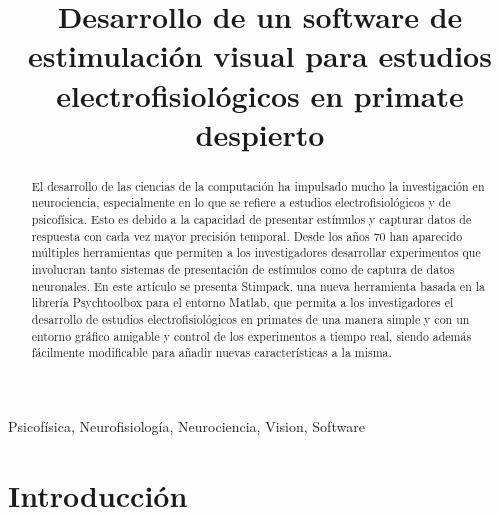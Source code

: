 \documentclass[conference]{IEEEtran}
\begin{document}
\title{Desarrollo de un software de estimulación visual para estudios electrofisiológicos en primate
despierto\\
}

\author{

}

\maketitle

\begin{abstract}
El desarrollo de las ciencias de la computación ha impulsado mucho la investigación en neurociencia, especialmente en lo que se refiere a estudios electrofisiológicos y de psicofísica. Esto es debido a la capacidad de presentar estímulos y capturar datos de respuesta con cada vez mayor precisión temporal. Desde los años 70 han aparecido múltiples herramientas que permiten a los investigadores desarrollar experimentos que involucran tanto sistemas de presentación de estímulos como de captura de datos neuronales. En este artículo se presenta Stimpack, una nueva herramienta basada en la librería Psychtoolbox para el entorno Matlab, que permita a los investigadores el desarrollo de estudios electrofisiológicos en primates de una manera simple y con un entorno gráfico amigable y control de los experimentos a tiempo real, siendo además fácilmente modificable para añadir nuevas características a la misma. 

\end{abstract}
\begin{IEEEkeywords}
Psicofísica, Neurofisiología, Neurociencia, Vision, Software
\end{IEEEkeywords}

\section{Introducción}
\end{document}
